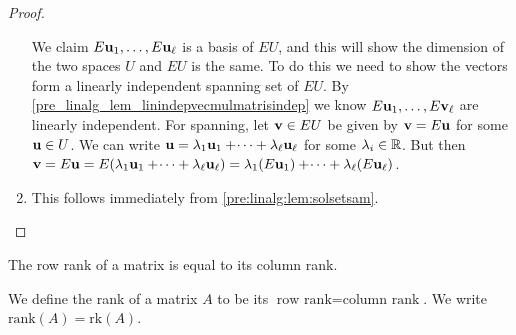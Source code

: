 \documentclass[10pt, a4paper]{article}
\begin{document}
\begin{proposition}
\begin{proof}
\begin{enumerate}[label = (\roman*)]
            We claim $E\mathbf{u}_1, \dotsc, E\mathbf{u}_{\ell}$ is a basis of $EU$,
            and this will show the dimension of the two spaces $U$ and $EU$ is the same.
            To do this we need to show the vectors form a linearly independent spanning set of $EU$.
            By \autoref{pre_linalg_lem_linindepvecmulmatrisindep} we know $E\mathbf{u}_1, \dotsc, E\mathbf{v}_{\ell}$ are linearly independent.
            For spanning,
            let $\mathbf{v} \in EU$ be given by $\mathbf{v} = E\mathbf{u}$ for some $\mathbf{u} \in U$.
            We can write $\mathbf{u} = \lambda_1\mathbf{u}_1 + \dotsi + \lambda_{\ell}\mathbf{u}_{\ell}$ for some $\lambda_i \in \mathbb{R}$.
            But then $\mathbf{v} = E\mathbf{u} = E(\lambda_1\mathbf{u}_1 + \dotsi + \lambda_{\ell}\mathbf{u}_{\ell}) = \lambda_1(E\mathbf{u}_1) + \dotsi + \lambda_{\ell}(E\mathbf{u}_{\ell})$.
            \item This follows immediately from \autoref{pre:linalg:lem:solsetsam}.
        \end{enumerate}
    \end{proof}
\end{proposition}

\begin{theorem}\label{pre_linalg_thm_ranktheorem}
    The row rank of a matrix is equal to its column rank.
\end{theorem}

\begin{definition}[Rank]
    We define the rank of a matrix $A$ to be its $\text{row rank} = \text{column rank}$.
    We write $\mathrm{rank}(A) = \mathrm{rk}(A)$.
\end{definition}
\end{document}
